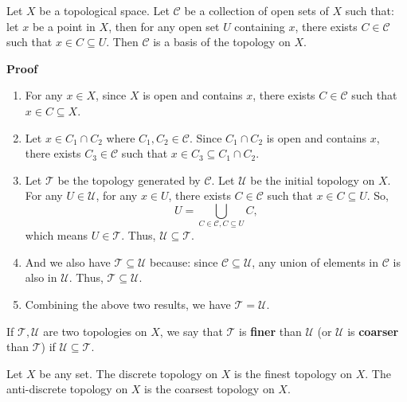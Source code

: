 \documentclass[main.tex]{subfiles}
\begin{document}
\begin{lemma}
    Let $X$ be a topological space. Let $\mathcal{C}$ be a collection of open sets of $X$ such that: let $x$ be a point in $X$, then for any open set $U$ containing $x$, there exists $C \in \mathcal{C}$ such that $x \in C \subseteq U$. Then $\mathcal{C}$ is a basis of the topology on $X$. 
\end{lemma}
\par \noindent \textbf{Proof} 
\begin{enumerate}
    \item For any $x \in X$, since $X$ is open and contains $x$, there exists $C \in \mathcal{C}$ such that $x \in C \subseteq X$. 
    \item Let $x \in C_1 \cap C_2$ where $C_1, C_2 \in \mathcal{C}$. Since $C_1 \cap C_2$ is open and contains $x$, there exists $C_3 \in \mathcal{C}$ such that $x \in C_3 \subseteq C_1 \cap C_2$.
    \item Let $\mathcal{T}$ be the topology generated by $\mathcal{C}$. Let $\mathcal{U}$ be the initial topology on $X$. For any $U \in \mathcal{U}$, for any $x \in U$, there exists $C \in \mathcal{C}$ such that $x \in C \subseteq U$. So, \begin{equation}
        U = \bigcup_{C \in \mathcal{C}, C \subseteq U} C,
    \end{equation}
    which means $U \in \mathcal{T}$. Thus, $\mathcal{U} \subseteq \mathcal{T}$. 
    \item And we also have $\mathcal{T} \subseteq \mathcal{U}$ because: since $\mathcal{C} \subseteq \mathcal{U}$, any union of elements in $\mathcal{C}$ is also in $\mathcal{U}$. Thus, $\mathcal{T} \subseteq \mathcal{U}$.
    \item Combining the above two results, we have $\mathcal{T} = \mathcal{U}$.
\end{enumerate}

\begin{definition}
    If $\mathcal{T}, \mathcal{U}$ are two topologies on $X$, we say that $\mathcal{T}$ is \textbf{finer} than $\mathcal{U}$ (or $\mathcal{U}$ is \textbf{coarser} than $\mathcal{T}$) if $\mathcal{U} \subseteq \mathcal{T}$.
\end{definition}

\begin{example}
    Let $X$ be any set. The discrete topology on $X$ is the finest topology on $X$. The anti-discrete topology on $X$ is the coarsest topology on $X$. 
\end{example}
\end{document}
